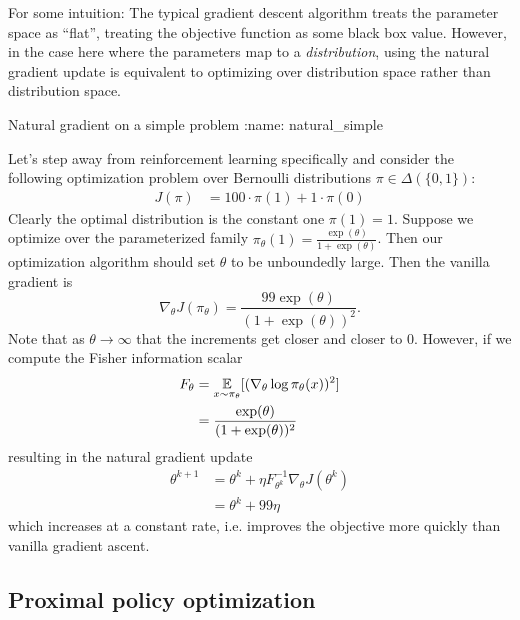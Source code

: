 \documentclass[\main/main]{subfiles}
\begin{document}

For some intuition: The typical gradient descent algorithm treats the parameter space as ``flat'', treating the objective function as some black box value. However, in the case here where the parameters map to a \emph{distribution}, using the natural gradient update is equivalent to optimizing over distribution space rather than distribution space.

\begin{example}{Natural gradient on a simple problem}
:name: natural_simple

    Let's step away from reinforcement learning specifically and consider the following optimization problem over Bernoulli distributions $\pi \in \Delta(\{ 0, 1 \})$:
    \begin{align*}
        J(\pi) & = 100 \cdot \pi(1) + 1 \cdot \pi(0)
    \end{align*}
    Clearly the optimal distribution is the constant one $\pi(1) = 1$.
    Suppose we optimize over the parameterized family $\pi_\theta(1) = \frac{\exp(\theta)}{1+\exp(\theta)}$. Then our optimization algorithm should set $\theta$ to be unboundedly large.
    Then the vanilla gradient is
    \[
        \nabla_\theta J(\pi_\theta) = \frac{99 \exp(\theta)}{(1 + \exp(\theta))^2}.
    \]
    Note that as $\theta \to \infty$ that the increments get closer and closer to $0$.
    However, if we compute the Fisher information scalar
    \begin{align*}
        F_\theta & = \operatorname*{\mathbb{E}}_{x \sim \pi_\theta} [ (\nabla_\theta \log \pi_\theta(x))^2 ] \\
                 & = \frac{\exp(\theta)}{(1 + \exp(\theta))^2}
    \end{align*}
    resulting in the natural gradient update
    \begin{align*}
        \theta^{k+1} & = \theta^k + \eta F_{\theta^k}^{-1} \nabla_ \theta J(\theta^k) \\
                     & = \theta^k + 99 \eta
    \end{align*}
    which increases at a constant rate, i.e. improves the objective more quickly than vanilla gradient ascent.
\end{example}

\subsection{Proximal policy optimization}
\end{document}
